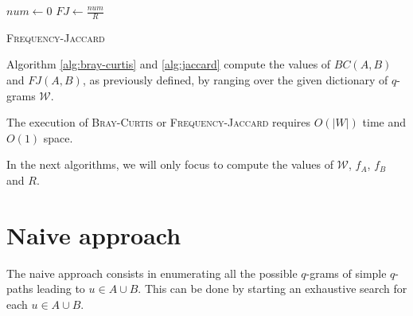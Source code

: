 \begin{algorithm}[h]
	\small
	\DontPrintSemicolon
	\BlankLine
	$num \gets 0$\;
	$FJ \gets \frac{num}{R}$\;
	\caption{\textsc{Frequency-Jaccard}}
	\label{alg:jaccard}
\end{algorithm}

Algorithm \ref{alg:bray-curtis} and \ref{alg:jaccard} compute the values of $BC(A,B)$ and $FJ(A,B)$, as previously defined, by ranging over the given dictionary of $q$-grams $\mathcal{W}$.

\begin{lemma}
	The execution of \textsc{Bray-Curtis} or \textsc{Frequency-Jaccard} requires $O(|W|)$ time and $O(1)$ space. 	
\end{lemma}

In the next algorithms, we will only focus to compute the values of $\mathcal{W}$, $f_{A}$, $f_{B}$ and $R$.

\clearpage 

\section{Naive approach}

The naive approach consists in enumerating all the possible $q$-grams of simple $q$-paths leading to $u \in A \cup B$. This can be done by starting an exhaustive search for each $u \in A \cup B$.
	

